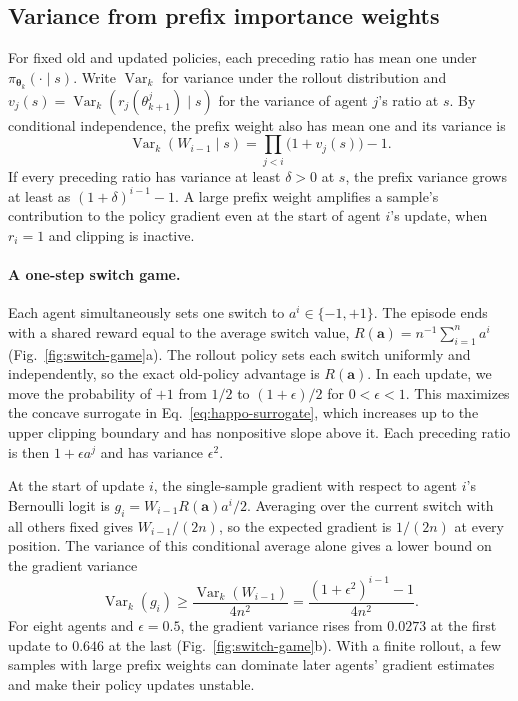 \documentclass{article}
\newcommand{\Var}{\operatorname{Var}}
\begin{document}
\subsection{Variance from prefix importance weights}
\label{sec:prefix-weight-variance}

For fixed old and updated policies, each preceding ratio has mean one under $\pi_{\boldsymbol\theta_k}(\cdot\mid s)$. Write $\Var_k$ for variance under the rollout distribution and $v_j(s)=\Var_k(r_j(\theta_{k+1}^j)\mid s)$ for the variance of agent $j$'s ratio at $s$. By conditional independence, the prefix weight also has mean one and its variance is
\begin{equation}
    \Var_k(W_{i-1}\mid s)=\prod_{j<i}\bigl(1+v_j(s)\bigr)-1.
    \label{eq:prefix-weight-variance}
\end{equation}
If every preceding ratio has variance at least $\delta>0$ at $s$, the prefix variance grows at least as $(1+\delta)^{i-1}-1$. A large prefix weight amplifies a sample's contribution to the policy gradient even at the start of agent $i$'s update, when $r_i=1$ and clipping is inactive.

\paragraph{A one-step switch game.}
Each agent simultaneously sets one switch to $a^i\in\{-1,+1\}$. The episode ends with a shared reward equal to the average switch value, $R(\boldsymbol a)=n^{-1}\sum_{i=1}^n a^i$ (Fig.~\ref{fig:switch-game}a). The rollout policy sets each switch uniformly and independently, so the exact old-policy advantage is $R(\boldsymbol a)$. In each update, we move the probability of $+1$ from $1/2$ to $(1+\epsilon)/2$ for $0<\epsilon<1$. This maximizes the concave surrogate in Eq.~\eqref{eq:happo-surrogate}, which increases up to the upper clipping boundary and has nonpositive slope above it. Each preceding ratio is then $1+\epsilon a^j$ and has variance $\epsilon^2$.

At the start of update $i$, the single-sample gradient with respect to agent $i$'s Bernoulli logit is $g_i=W_{i-1}R(\boldsymbol a)a^i/2$. Averaging over the current switch with all others fixed gives $W_{i-1}/(2n)$, so the expected gradient is $1/(2n)$ at every position. The variance of this conditional average alone gives a lower bound on the gradient variance
\begin{equation}
    \Var_k(g_i)
    \ge \frac{\Var_k(W_{i-1})}{4n^2}
    = \frac{(1+\epsilon^2)^{i-1}-1}{4n^2}.
    \label{eq:switch-game-variance}
\end{equation}
For eight agents and $\epsilon=0.5$, the gradient variance rises from $0.0273$ at the first update to $0.646$ at the last (Fig.~\ref{fig:switch-game}b). With a finite rollout, a few samples with large prefix weights can dominate later agents' gradient estimates and make their policy updates unstable.
\end{document}
